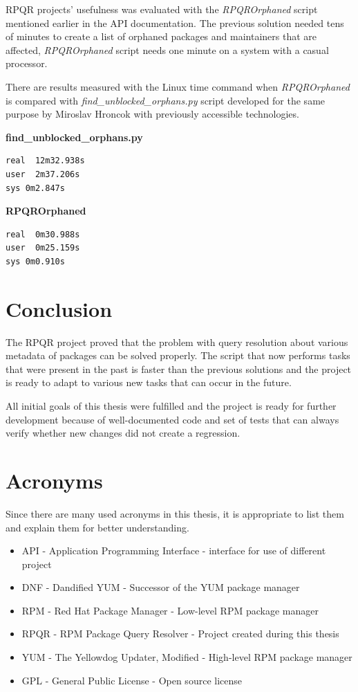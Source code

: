 RPQR projects' usefulness was evaluated with the \textit{RPQROrphaned} script mentioned earlier in
the API documentation. The previous solution needed tens of minutes to create a list of orphaned packages
and maintainers that are affected, \textit{RPQROrphaned} script needs one minute on a system with a casual processor.

There are results measured with the Linux time command when \textit{RPQROrphaned} is compared with \textit{find\_unblocked\_orphans.py}\cite{orphans}
script developed for the same purpose by Miroslav Hroncok with previously accessible technologies.

\textbf{find\_unblocked\_orphans.py}

\begin{lstlisting}
real  12m32.938s
user  2m37.206s
sys 0m2.847s  
\end{lstlisting}

\textbf{RPQROrphaned}

\begin{lstlisting}
real  0m30.988s
user  0m25.159s
sys 0m0.910s
\end{lstlisting}

\chapter{Conclusion}

The RPQR project proved that the problem with query resolution about various metadata of packages can
be solved properly. The script that now performs tasks that were present in the past is faster than the
previous solutions and the project is ready to adapt to various new tasks that can occur in the future.

All initial goals of this thesis were fulfilled and the project is ready for further development because
of well-documented code and set of tests that can always verify whether new changes did not create a
regression.

\chapter{Acronyms}

Since there are many used acronyms in this thesis, it is appropriate to list them and explain them
for better understanding.

\begin{itemize}
  \item API - Application Programming Interface - interface for use of different project
  \item DNF - Dandified YUM - Successor of the YUM package manager
  \item RPM - Red Hat Package Manager - Low-level RPM package manager 
  \item RPQR - RPM Package Query Resolver - Project created during this thesis
  \item YUM - The Yellowdog Updater, Modified - High-level RPM package manager
  \item GPL - General Public License - Open source license
\end{itemize}

